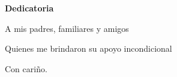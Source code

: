 \begin{dedication}
\textbf{Dedicatoria}
  
\begin{itshape}
A mis padres, familiares y amigos 

Quienes me brindaron su apoyo incondicional 

Con cariño. 
\end{itshape}
\end{dedication}
